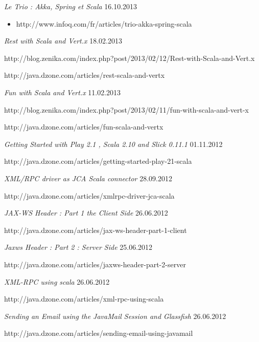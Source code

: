 \documentclass{res}
\begin{document}
\begin{resume}
{\sl Le Trio : Akka, Spring et Scala}  \hfill    16.10.2013	\\
\begin{itemize} %
 \item[] http://www.infoq.com/fr/articles/trio-akka-spring-scala
\end{itemize}

{\sl Rest with Scala and Vert.x}  \hfill    18.02.2013	\\
\item[] http://blog.zenika.com/index.php?post/2013/02/12/Rest-with-Scala-and-Vert.x
\item[] http://java.dzone.com/articles/rest-scala-and-vertx

{\sl Fun with Scala and Vert.x}  \hfill    11.02.2013	\\
\item[] http://blog.zenika.com/index.php?post/2013/02/11/fun-with-scala-and-vert-x
\item[] http://java.dzone.com/articles/fun-scala-and-vertx

{\sl Getting Started with Play 2.1 , Scala 2.10 and Slick 0.11.1}  \hfill    01.11.2012	\\
\item[] http://java.dzone.com/articles/getting-started-play-21-scala

{\sl XML/RPC driver as JCA Scala connector}  \hfill    28.09.2012	\\
\item[] http://java.dzone.com/articles/xmlrpc-driver-jca-scala

{\sl JAX-WS Header : Part 1 the Client Side}  \hfill   26.06.2012	\\
\item[] http://java.dzone.com/articles/jax-ws-header-part-1-client

{\sl Jaxws Header : Part 2 : Server Side}  \hfill    25.06.2012	\\
\item[] http://java.dzone.com/articles/jaxws-header-part-2-server

{\sl XML-RPC using scala}  \hfill    26.06.2012	\\
\item[] http://java.dzone.com/articles/xml-rpc-using-scala

{\sl Sending an Email using the JavaMail Session and Glassfish}  \hfill    26.06.2012 \\
\item[] http://java.dzone.com/articles/sending-email-using-javamail


\end{resume}
\end{document}
